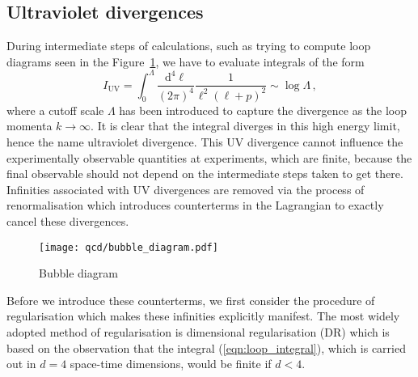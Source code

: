 \documentclass[main.tex]{subfiles}
\begin{document}
\subsection{Ultraviolet divergences}\label{sec:UV}
    During intermediate steps of calculations,
    such as trying to compute loop diagrams seen in
    the Figure~\ref{fig:bubble_diagram},
    we have to evaluate integrals of the form
    \begin{equation}\label{eqn:loop_integral}
        I_{\mathrm{UV}} = \int_{0}^{\Lambda} \dfrac{\mathrm{d}^{4}\ell}{(2\pi)^{4}}\dfrac{1}{\ell^{2}(\ell+p)^{2}} \sim \log{\Lambda} \, ,
    \end{equation}
    where a cutoff scale $\Lambda$ has been introduced to
    capture the divergence as the loop momenta
    $k \rightarrow \infty$. It is clear that the
    integral diverges in this high energy limit,
    hence the name ultraviolet divergence.
    This UV divergence cannot influence the
    experimentally observable quantities at experiments,
    which are finite, because the final observable
    should not depend on the intermediate steps taken
    to get there.
    Infinities associated with UV divergences
    are removed via the process of renormalisation
    which introduces counterterms in the Lagrangian
    to exactly cancel these divergences.

    \begin{figure}
        \texttt{[image: qcd/bubble\_diagram.pdf]}
        \caption{Bubble diagram}
        \label{fig:bubble_diagram}
    \end{figure}

    Before we introduce these counterterms, we
    first consider the procedure of regularisation
    which makes these infinities explicitly manifest.
    The most widely adopted method of regularisation
    is dimensional regularisation (DR) \cite{tHooft:1972tcz} which
    is based on the observation that the integral
    (\ref{eqn:loop_integral}), which is carried
    out in $d=4$ space-time dimensions, would be finite
    if $d < 4$.
\end{document}
